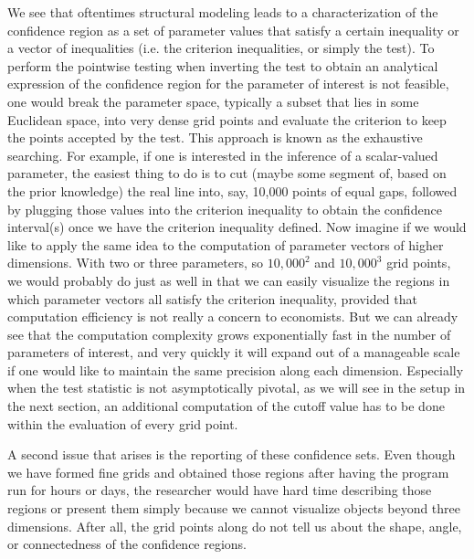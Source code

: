 \documentclass[12pt]{article}
\theoremstyle{definition}
\begin{document}
We see that oftentimes structural modeling leads to a characterization of the confidence region as a set of parameter values that satisfy a certain inequality or a vector of inequalities (i.e. the criterion inequalities, or simply the test). To perform the pointwise testing when inverting the test to obtain an analytical expression of the confidence region for the parameter of interest is not feasible, one would break the parameter space, typically a subset that lies in some Euclidean space, into very dense grid points and evaluate the criterion to keep the points accepted by the test. This approach is known as the exhaustive searching. For example, if one is interested in the inference of a scalar-valued parameter, the easiest thing to do is to cut (maybe some segment of, based on the prior knowledge) the real line into, say, 10,000 points of equal gaps, followed by plugging those values into the criterion inequality to obtain the confidence interval(s) once we have the criterion inequality defined. Now imagine if we would like to apply the same idea to the computation of parameter vectors of higher dimensions. With two or three parameters, so $10,000^2$ and $10,000^3$ grid points, we would probably do just as well in that we can easily visualize the regions in which parameter vectors all satisfy the criterion inequality, provided that computation efficiency is not really a concern to economists. But we can already see that the computation complexity grows exponentially fast in the number of parameters of interest, and very quickly it will expand out of a manageable scale if one would like to maintain the same precision along each dimension. Especially when the test statistic is not asymptotically pivotal, as we will see in the setup in the next section, an additional computation of the cutoff value has to be done within the evaluation of every grid point.

A second issue that arises is the reporting of these confidence sets. Even though we have formed fine grids and obtained those regions after having the program run for hours or days, the researcher would have hard time describing those regions or present them simply because we cannot visualize objects beyond three dimensions. After all, the grid points along do not tell us about the shape, angle, or connectedness of the confidence regions. 
\end{document}
